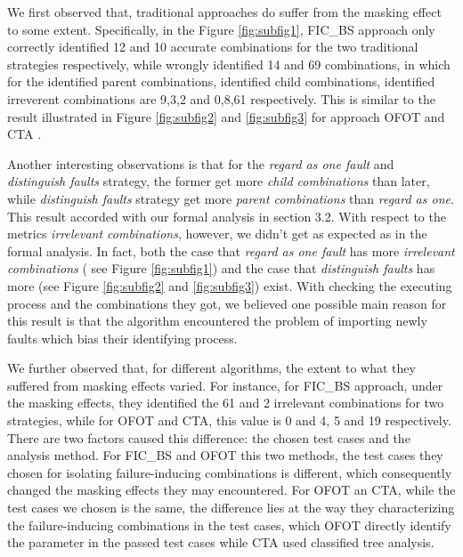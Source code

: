 \documentclass{sig-alternate}
\begin{document}
We first observed that, traditional approaches do suffer from the masking effect to some extent. Specifically, in the Figure \ref{fig:subfig1}, FIC\_BS approach only correctly identified 12 and 10 accurate combinations for the two traditional strategies respectively, while wrongly identified 14 and 69 combinations, in which for the identified parent combinations, identified child combinations, identified irreverent combinations are 9,3,2 and 0,8,61 respectively. This is similar to the result illustrated in Figure \ref{fig:subfig2} and \ref{fig:subfig3} for approach OFOT and CTA .

Another interesting observations is that for the \emph{regard as one fault} and \emph{distinguish faults} strategy, the former get more \emph{child combinations} than later, while \emph{distinguish faults} strategy get more \emph{parent combinations} than \emph{regard as one}. This result accorded with our formal analysis in section 3.2. With respect to the metrics \emph{irrelevant combinations}, however, we didn't get as expected as in the formal analysis. In fact, both the case that \emph{regard as one fault} has more \emph{irrelevant combinations} ( see Figure \ref{fig:subfig1}) and the case that \emph{distinguish faults} has more (see Figure \ref{fig:subfig2} and \ref{fig:subfig3}) exist. With checking the executing process and the combinations they got, we believed one possible main reason for this result is that the algorithm encountered the problem of importing newly faults which bias their identifying process.


We further observed that, for different algorithms, the extent to what they suffered from masking effects varied. For instance, for FIC\_BS approach, under the masking effects, they  identified the 61 and 2 irrelevant combinations for two strategies, while for OFOT and CTA, this value is 0 and 4, 5 and 19 respectively. There are two factors caused this difference: the chosen test cases and the analysis method. For FIC\_BS and OFOT this two methods, the test cases they chosen for isolating failure-inducing combinations is different, which consequently changed the masking effects they may encountered. For OFOT an CTA, while the test cases we chosen is the same, the difference lies at the way they characterizing the failure-inducing combinations in the test cases, which OFOT directly identify the parameter in the passed test cases while CTA used classified tree analysis.
\end{document}
